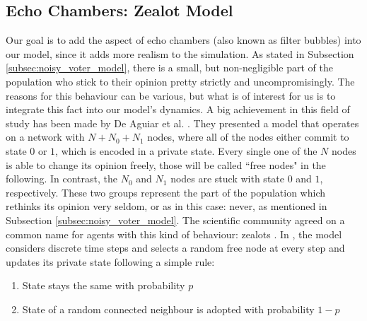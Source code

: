 \documentclass[12pt,a4paper,twoside]{article}
\begin{document}
\subsection{Echo Chambers: Zealot Model}
Our goal is to add the aspect of echo chambers \cite{Nguyen2020} (also known as filter bubbles) into our model, since it adds more realism to the simulation. As stated in Subsection \ref{subsec:noisy_voter_model}, there is a small, but non-negligible part of the population who stick to their opinion pretty strictly and uncompromisingly. The reasons for this behaviour can be various, but what is of interest for us is to integrate this fact into our model's dynamics. A big achievement in this field of study has been made by De Aguiar et al. \cite{Aguiar2011, Chinellato2015, Braha2017}. They presented a model that operates on a network with $N + N_0 + N_1$ nodes, where all of the nodes either commit to state $0$ or $1$, which is encoded in a private state. Every single one of the $N$ nodes is able to change its opinion freely, those will be called ``free nodes" in the following. In contrast, the $N_0$ and $N_1$ nodes are stuck with state $0$ and $1$, respectively. These two groups represent the part of the population which rethinks its opinion very seldom, or as in this case: never, as mentioned in Subsection \ref{subsec:noisy_voter_model}. The scientific community agreed on a common name for agents with this kind of behaviour: zealots \cite{Mobilia2003, Chinellato2015, Braha2017}. In \cite{Chinellato2015}, the model considers discrete time steps and selects a random free node at every step and updates its private state following a simple rule:
\begin{enumerate}\label{rule:chinellato_update}
	\item State stays the same with probability $p$
	\item State of a random connected neighbour is adopted with probability $1-p$
\end{enumerate}
\end{document}
